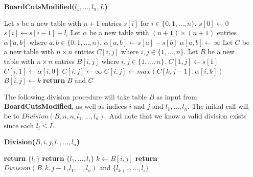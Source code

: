 \documentclass[12pt]{article}
\begin{document}
\begin{algorithm}[hbt!]
\caption{\textbf{BoardCutsModified($l_1,...,l_n,L$)}}\label{alg:cap}

\begin{algorithmic}[1]
\State Let $s$ be a new table with $n+1$ entries $s[i]$ for $i \in \{0,1,...,n\}$.
\State $s[0] \gets 0$
    \State $s[i] \gets s[i-1] + l_i$
\EndFor
\State
\State Let $\alpha$ be a new table with $(n+1) \times (n+1)$ entries $\alpha[a,b]$ where $a,b \in \{0,1,...,n\}$. 
         
            \State $\alpha[a,b] \gets s[a] - s[b]$
        \Else
            \State $\alpha[a,b] \gets \infty$
        \EndIf
    \EndFor
\EndFor
\State
\State Let $C$ be a new table with $n \times n$ entries $C[i,j]$ where $i,j \in \{1,...,n\}$. 
\State Let $B$ be a new table with $n \times n$ entries $B[i,j]$ where $i,j \in \{1,...,n\}$.
\State
{} 
    \State $C[1,j] \gets s[1]$
\EndFor
\State
{} 
    \State $C[i,1] \gets \alpha[i,0]$
\EndFor
\State
{} 
        \State $C[i,j] \gets \infty$
                \State $C[i,j] \gets max(C[k,j-1], \alpha[i,k])$
                \State $B[i,j] \gets k$
            \EndIf
        \EndFor
    \EndFor
\EndFor
\State
\State \textbf{return} $B$ and $C$ 
\end{algorithmic}
\end{algorithm}

\newpage

The following division procedure will take table $B$ as input from \textbf{BoardCutsModified}, as well as indices $i$ and $j$ and $l_1,...,l_n$. The initial call will be to $Division(B,n,n,l_1,...,l_n)$. And note that we know a valid division exists since each $l_i \leq L$.

\begin{algorithm}[hbt!]
\caption{\textbf{Division($B,i,j,l_1,...,l_n$)}}\label{alg:cap}

\begin{algorithmic}[1]
    \State \textbf{return} $\{l_1\}$
\EndIf
\State
{}
    \State \textbf{return} $\{l_1,...,l_i\}$ 
\EndIf
\State
{} 
    \State $k \gets B[i,j]$
    \State \textbf{return} $Division(B,k,j-1,l_1,...,l_n)$ and $\{l_{k+1},...,l_i\}$ 
\EndIf
\end{algorithmic}
\end{algorithm}
\end{document}
